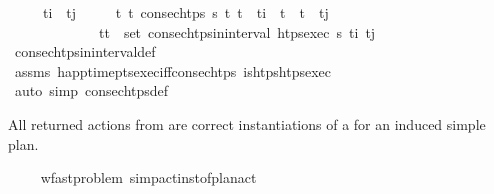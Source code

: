 \begin{isabellebody}
\ \ \ \ \ {\isachardoublequoteopen}t\isactrlsub i\ {\isasymle}\ t\isactrlsub j{\isachardoublequoteclose}\isanewline
\ \ \ \ \ {\isachardoublequoteopen}{\isasymforall}t\ t{\isacharprime}{\kern0pt}{\isachardot}{\kern0pt}\ {\isacharparenleft}{\kern0pt}consec{\isacharunderscore}{\kern0pt}htps\ {\isasympi}s\ t\ t{\isacharprime}{\kern0pt}\ {\isasymand}\ t\isactrlsub i\ {\isasymle}\ t\ {\isasymand}\ t{\isacharprime}{\kern0pt}\ {\isasymle}\ t\isactrlsub j{\isacharparenright}{\kern0pt}\ \isanewline
\ \ \ \ \ \ \ \ \ \ \ \ {\isasymlongleftrightarrow}\ {\isacharparenleft}{\kern0pt}t{\isacharcomma}{\kern0pt}t{\isacharprime}{\kern0pt}{\isacharparenright}{\kern0pt}\ {\isasymin}\ set\ {\isacharparenleft}{\kern0pt}consec{\isacharunderscore}{\kern0pt}htps{\isacharunderscore}{\kern0pt}in{\isacharunderscore}{\kern0pt}interval\ {\isacharparenleft}{\kern0pt}htps{\isacharunderscore}{\kern0pt}exec\ {\isasympi}s{\isacharparenright}{\kern0pt}\ t\isactrlsub i\ t\isactrlsub j{\isacharparenright}{\kern0pt}{\isachardoublequoteclose}\isanewline
%
\isadelimproof
\ \ \ \ %
\endisadelimproof
%
\isatagproof
{}\isamarkupfalse%
\ consec{\isacharunderscore}{\kern0pt}htps{\isacharunderscore}{\kern0pt}in{\isacharunderscore}{\kern0pt}interval{\isacharunderscore}{\kern0pt}def\isanewline
\ \ \ \ \isamarkupfalse%
\ assms\ happ{\isacharunderscore}{\kern0pt}time{\isacharunderscore}{\kern0pt}pts{\isacharunderscore}{\kern0pt}exec{\isacharunderscore}{\kern0pt}iff{\isacharunderscore}{\kern0pt}consec{\isacharunderscore}{\kern0pt}htps\ is{\isacharunderscore}{\kern0pt}htps{\isacharunderscore}{\kern0pt}htps{\isacharunderscore}{\kern0pt}exec\isanewline
\ \ \ \ \isamarkupfalse%
\ {\isacharparenleft}{\kern0pt}auto\ simp{\isacharcolon}{\kern0pt}\ consec{\isacharunderscore}{\kern0pt}htps{\isacharunderscore}{\kern0pt}def{\isacharparenright}{\kern0pt}%
\endisatagproof
{\isafoldproof}%
%
\isadelimproof
%
\endisadelimproof
%
\begin{isamarkuptext}%
All returned actions from  are correct instantiations of a  
  for an induced simple plan.%
\end{isamarkuptext}\isamarkuptrue%
\ \ \isamarkupfalse%
\ {\isacharparenleft}{\kern0pt}\ wf{\isacharunderscore}{\kern0pt}ast{\isacharunderscore}{\kern0pt}problem{\isacharparenright}{\kern0pt}\ simp{\isacharunderscore}{\kern0pt}act{\isacharunderscore}{\kern0pt}inst{\isacharunderscore}{\kern0pt}of{\isacharunderscore}{\kern0pt}plan{\isacharunderscore}{\kern0pt}act{\isacharcolon}{\kern0pt}\ \isanewline

\end{isabellebody}
